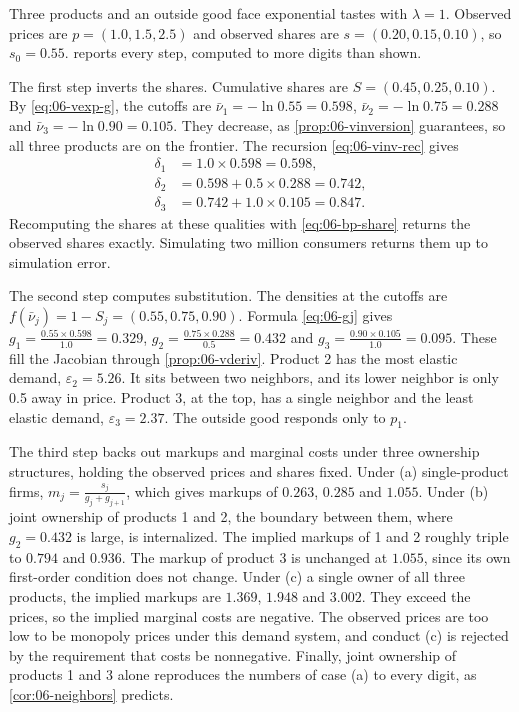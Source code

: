 \begin{example}\label{ex:06-vnumeric}
Three products and an outside good face exponential tastes with $\lambda = 1$. Observed prices are
$p = (1.0, 1.5, 2.5)$ and observed shares are $s = (0.20, 0.15, 0.10)$, so $s_0 = 0.55$. 
reports every step, computed to more digits than shown.

The first step inverts the shares. Cumulative shares are $S = (0.45, 0.25, 0.10)$. By \eqref{eq:06-vexp-g},
the cutoffs are $\bar\nu_1 = -\ln 0.55 = 0.598$, $\bar\nu_2 = -\ln 0.75 = 0.288$ and $\bar\nu_3 = -\ln 0.90 = 0.105$.
They decrease, as \cref{prop:06-vinversion} guarantees, so all three products are on the frontier. The
recursion \eqref{eq:06-vinv-rec} gives
\begin{align*}
  \delta_1 &= 1.0 \times 0.598 = 0.598,\\
  \delta_2 &= 0.598 + 0.5 \times 0.288 = 0.742,\\
  \delta_3 &= 0.742 + 1.0 \times 0.105 = 0.847 .
\end{align*}
Recomputing the shares at these qualities with \eqref{eq:06-bp-share} returns the observed shares
exactly. Simulating two million consumers returns them up to simulation error.

The second step computes substitution. The densities at the cutoffs are $f(\bar\nu_j) = 1 - S_j = (0.55, 0.75,
0.90)$. Formula \eqref{eq:06-gj} gives $g_1 = \frac{0.55 \times 0.598}{1.0} = 0.329$, $g_2 = \frac{0.75 \times 0.288}{0.5}
= 0.432$ and $g_3 = \frac{0.90 \times 0.105}{1.0} = 0.095$. These fill the Jacobian through
\cref{prop:06-vderiv}. Product 2 has the most elastic demand, $\varepsilon_2 = 5.26$. It sits between two
neighbors, and its lower neighbor is only 0.5 away in price. Product 3, at the top, has a single
neighbor and the least elastic demand, $\varepsilon_3 = 2.37$. The outside good responds only to $p_1$.

The third step backs out markups and marginal costs under three ownership structures, holding the observed
prices and shares fixed. Under (a) single-product firms, $m_j = \frac{s_j}{g_j + g_{j+1}}$, which gives
markups of $0.263$, $0.285$ and $1.055$. Under (b) joint ownership of products 1 and 2, the boundary between
them, where $g_2 = 0.432$ is large, is internalized. The implied markups of 1 and 2 roughly triple to
$0.794$ and $0.936$. The markup of product 3 is unchanged at $1.055$, since its own first-order condition
does not change. Under (c) a single owner of all three products, the implied markups are $1.369$, $1.948$
and $3.002$. They exceed the prices, so the implied marginal costs are negative. The observed prices are
too low to be monopoly prices under this demand system, and conduct (c) is rejected by the requirement
that costs be nonnegative. Finally, joint ownership of products 1 and 3 alone reproduces the numbers of
case (a) to every digit, as \cref{cor:06-neighbors} predicts.
\end{example}

